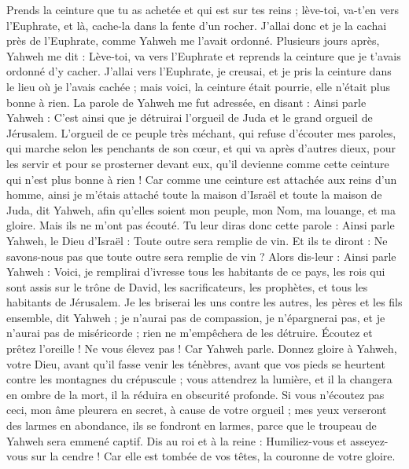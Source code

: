 \begin{multicols}{2}
Prends la ceinture que tu as achetée et qui est sur tes reins ; lève-toi, va-t'en vers l'Euphrate, et là, cache-la dans la fente d'un rocher.
J'allai donc et je la cachai près de l'Euphrate, comme Yahweh me l'avait ordonné.
Plusieurs jours après, Yahweh me dit : Lève-toi, va vers l'Euphrate et reprends la ceinture que je t'avais ordonné d'y cacher.
J'allai vers l'Euphrate, je creusai, et je pris la ceinture dans le lieu où je l'avais cachée ; mais voici, la ceinture était pourrie, elle n'était plus bonne à rien.
La parole de Yahweh me fut adressée, en disant :
Ainsi parle Yahweh : C'est ainsi que je détruirai l'orgueil de Juda et le grand orgueil de Jérusalem.
L'orgueil de ce peuple très méchant, qui refuse d'écouter mes paroles, qui marche selon les penchants de son cœur, et qui va après d'autres dieux, pour les servir et pour se prosterner devant eux, qu'il devienne comme cette ceinture qui n'est plus bonne à rien !
Car comme une ceinture est attachée aux reins d'un homme, ainsi je m'étais attaché toute la maison d'Israël et toute la maison de Juda, dit Yahweh, afin qu'elles soient mon peuple, mon Nom, ma louange, et ma gloire. Mais ils ne m'ont pas écouté.
Tu leur diras donc cette parole : Ainsi parle Yahweh, le Dieu d'Israël : Toute outre sera remplie de vin. Et ils te diront : Ne savons-nous pas que toute outre sera remplie de vin ?
Alors dis-leur : Ainsi parle Yahweh : Voici, je remplirai d'ivresse tous les habitants de ce pays, les rois qui sont assis sur le trône de David, les sacrificateurs, les prophètes, et tous les habitants de Jérusalem.
Je les briserai les uns contre les autres, les pères et les fils ensemble, dit Yahweh ; je n'aurai pas de compassion, je n'épargnerai pas, et je n'aurai pas de miséricorde ; rien ne m'empêchera de les détruire.
Écoutez et prêtez l'oreille ! Ne vous élevez pas ! Car Yahweh parle.
Donnez gloire à Yahweh, votre Dieu, avant qu'il fasse venir les ténèbres, avant que vos pieds se heurtent contre les montagnes du crépuscule ; vous attendrez la lumière, et il la changera en ombre de la mort, il la réduira en obscurité profonde.
Si vous n'écoutez pas ceci, mon âme pleurera en secret, à cause de votre orgueil ; mes yeux verseront des larmes en abondance, ils se fondront en larmes, parce que le troupeau de Yahweh sera emmené captif.
Dis au roi et à la reine : Humiliez-vous et asseyez-vous sur la cendre ! Car elle est tombée de vos têtes, la couronne de votre gloire.

\end{multicols}

